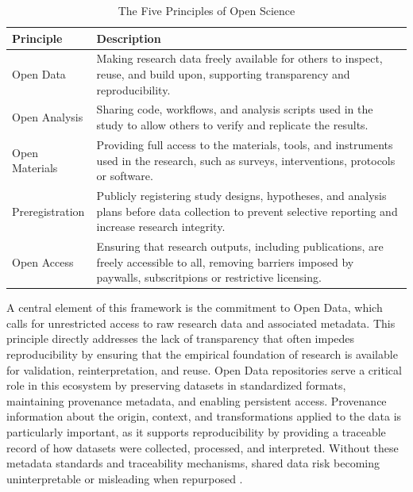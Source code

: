 \documentclass[final]{rc-book-2.14}
\begin{document}
\begin{table}[ht]
    \centering
    \caption{The Five Principles of Open Science \cite{van_dijk_open_2021}}
    \label{tab:open_science_principles}
    \begin{tabular}{|l|p{11cm}|}
        \hline
        \textbf{Principle} & \textbf{Description}                                                                                                                                                 \\
        \hline
        Open Data          & Making research data freely available for others to inspect, reuse, and build upon, supporting transparency and reproducibility.                                     \\
        \hline
        Open Analysis      & Sharing code, workflows, and analysis scripts used in the study to allow others to verify and replicate the results.                                                 \\
        \hline
        Open Materials     & Providing full access to the materials, tools, and instruments used in the research, such as surveys, interventions, protocols or software.                          \\
        \hline
        Preregistration    & Publicly registering study designs, hypotheses, and analysis plans before data collection to prevent selective reporting and increase research integrity.            \\
        \hline
        Open Access        & Ensuring that research outputs, including publications, are freely accessible to all, removing barriers imposed by paywalls, subscritpions or restrictive licensing. \\
        \hline
    \end{tabular}
\end{table}

A central element of this framework is the commitment to Open Data, which calls for unrestricted access to raw research data and associated metadata. This principle directly addresses the lack of transparency that often impedes reproducibility by ensuring that the empirical foundation of research is available for validation, reinterpretation, and reuse. Open Data repositories serve a critical role in this ecosystem by preserving datasets in standardized formats, maintaining provenance metadata, and enabling persistent access. Provenance information about the origin, context, and transformations applied to the data is particularly important, as it supports reproducibility by providing a traceable record of how datasets were collected, processed, and interpreted. Without these metadata standards and traceability mechanisms, shared data risk becoming uninterpretable or misleading when repurposed \cite{learn_2017, burgelman_open_2019}.
\end{document}
